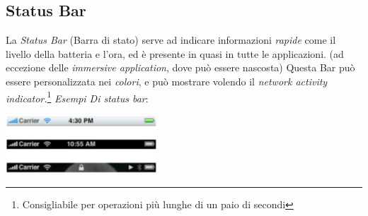 \documentclass[oneside]{book}
\begin{document}
		\newpage
		\subsection{Status Bar}
			La \emph{Status Bar} (Barra di stato) serve ad indicare informazioni \emph{rapide} come il livello della batteria e l'ora, ed è presente in quasi in tutte le applicazioni. (ad eccezione delle \emph{immersive application}, dove può essere nascosta) Questa Bar può essere personalizzata nei \emph{colori}, e può mostrare volendo il \emph{network activity indicator.}\footnote{Consigliabile per operazioni più lunghe di un paio di secondi}
			\emph{Esempi Di status bar}:
			\begin{center}
			\includegraphics[height = 22mm]{images/statusBar.png}
			\end{center}
\end{document}
